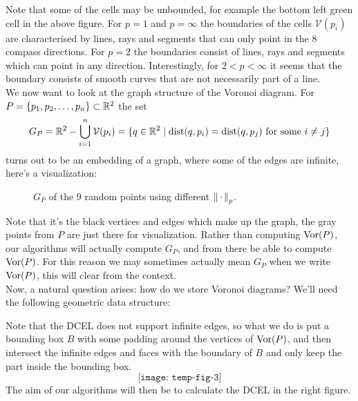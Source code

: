 Note that some of the cells may be unbounded, for example the bottom left green cell in the above figure. For $p = 1$ and $p = \infty$ the boundaries of the cells $\mathcal{V}(p_i)$ are characterised by lines, rays and segments that can only point in the 8 compass directions. For $p = 2$ the boundaries consist of lines, rays and segments which can point in any direction. Interestingly, for $2 < p < \infty$ it seems that the boundary consists of smooth curves that are not necessarily part of a line. \\

We now want to look at the graph structure of the Voronoi diagram. For $P = \{p_1, p_2, \ldots, p_n\} \subset \mathbb{R}^2$ the set
\[
    G_P = \mathbb{R}^2 - \bigcup_{i=1}^n \mathcal{V}(p_i)
    = \{q \in \mathbb{R}^2 \mid \operatorname{dist}(q, p_i) = \operatorname{dist}(q, p_j) \text{ for some } i \ne j\}
\]
turns out to be an embedding of a graph, where some of the edges are infinite, here's a visualization:
\begin{figure}[H]
    \centering
    \hspace{0mm}
    \caption{$G_P$ of the 9 random points using different $\left\lVert \,\cdot\, \right\rVert_p$.}
\end{figure}
Note that it's the black vertices and edges which make up the graph, the gray points from $P$ are just there for visualization. Rather than computing $\operatorname{Vor}(P)$, our algorithms will actually compute $G_P$, and from there be able to compute $\operatorname{Vor}(P)$. For this reason we may sometimes actually mean $G_P$ when we write $\operatorname{Vor}(P)$, this will clear from the context. \\

Now, a natural question arises: how do we store Voronoi diagrams? We'll need the following geometric data structure:
\begin{defn}[DCEL]
\end{defn}
Note that the DCEL does not support infinite edges, so what we do is put a bounding box $B$ with some padding around the vertices of $\operatorname{Vor}(P)$, and then intersect the infinite edges and faces with the boundary of $B$ and only keep the part inside the bounding box.
\[
    \texttt{[image: temp-fig-3]}
\]
The aim of our algorithms will then be to calculate the DCEL in the right figure.